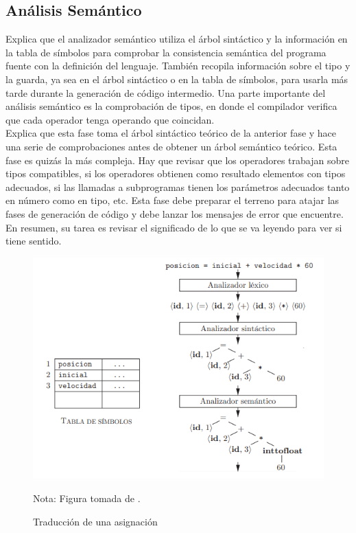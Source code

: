 \subsection{Análisis Semántico}
\cite{aho2008compiladores} Explica que el analizador semántico utiliza el árbol sintáctico y la información en la tabla de símbolos para comprobar la consistencia semántica del programa fuente con la definición del lenguaje. También recopila información sobre el tipo y la guarda, ya sea en el árbol sintáctico o en la tabla de símbolos, para usarla más tarde durante la generación de código intermedio.
Una parte importante del análisis semántico es la comprobación de tipos, en donde el compilador verifica que cada operador tenga operando que coincidan.\\

\cite{catalan2010compiladores} Explica que esta fase toma el árbol sintáctico teórico de la anterior fase y hace una serie de comprobaciones antes de obtener un árbol semántico teórico.
Esta fase es quizás la más compleja. Hay que revisar que los operadores trabajan sobre tipos compatibles, si los operadores obtienen como resultado elementos con tipos adecuados, si las llamadas a subprogramas tienen los parámetros adecuados tanto en
número como en tipo, etc. Esta fase debe preparar el terreno para atajar las fases de generación de código y debe lanzar los mensajes de error que encuentre. En resumen, su tarea es revisar el significado de lo que se va leyendo para ver si tiene sentido.

\begin{figure}[h!]
\centering
\includegraphics[scale=0.9]{imagenes/traduccionDeAsignacion1}
\caption{Traducción de una asignación}
Nota: Figura tomada de \cite{aho2008compiladores}.
\label{traduccion1}
\end{figure}

